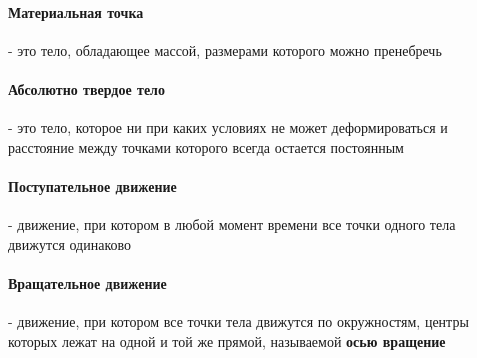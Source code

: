 \documentclass[class=article,a4paper,12pt,crop=false]{standalone}
\begin{document}
  \paragraph{Материальная точка}- это тело, обладающее массой, размерами которого можно пренебречь
  \paragraph{Абсолютно твердое тело} - это тело, которое ни при каких условиях не может деформироваться
  и расстояние между точками которого всегда остается постоянным
  \paragraph{Поступательное движение} - движение, при котором в любой момент времени все точки одного тела движутся одинаково
  \paragraph{Вращательное движение} - движение, при котором все точки тела движутся по окружностям,
  центры которых лежат на одной и той же прямой, называемой \textbf{осью вращение}
\end{document}
